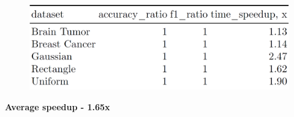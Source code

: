 \documentclass[aspectratio=169]{beamer}
\begin{document}
\begin{frame}
\begin{figure}
    \centering
    \includegraphics[width=1\linewidth]{speedup_groupby.png}
\end{figure}
\textbf{Average speedup - 1.65{\rm x}}
    
\end{frame}
\end{document}

